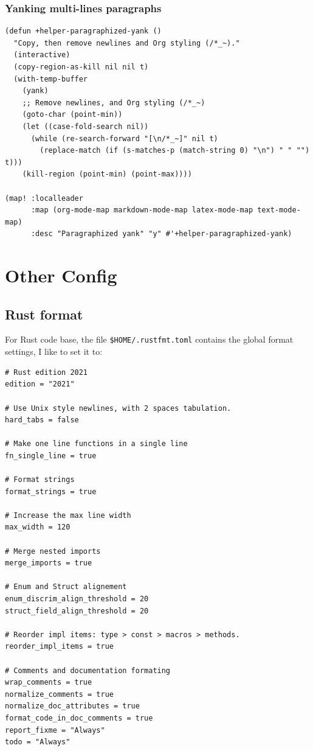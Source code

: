 \documentclass[11pt]{article}
\begin{document}
\subsubsection{Yanking multi-lines paragraphs}
\label{sec:org6ccbc8c}

\begin{verbatim}
(defun +helper-paragraphized-yank ()
  "Copy, then remove newlines and Org styling (/*_~)."
  (interactive)
  (copy-region-as-kill nil nil t)
  (with-temp-buffer
    (yank)
    ;; Remove newlines, and Org styling (/*_~)
    (goto-char (point-min))
    (let ((case-fold-search nil))
      (while (re-search-forward "[\n/*_~]" nil t)
        (replace-match (if (s-matches-p (match-string 0) "\n") " " "") t)))
    (kill-region (point-min) (point-max))))

(map! :localleader
      :map (org-mode-map markdown-mode-map latex-mode-map text-mode-map)
      :desc "Paragraphized yank" "y" #'+helper-paragraphized-yank)
\end{verbatim}

\section{Other Config}
\label{sec:org3658b12}
\subsection{Rust format}
\label{sec:org16bcf8d}
For Rust code base, the file \texttt{\$HOME/.rustfmt.toml} contains the global format
settings, I like to set it to:

\begin{verbatim}
# Rust edition 2021
edition = "2021"

# Use Unix style newlines, with 2 spaces tabulation.
hard_tabs = false

# Make one line functions in a single line
fn_single_line = true

# Format strings
format_strings = true

# Increase the max line width
max_width = 120

# Merge nested imports
merge_imports = true

# Enum and Struct alignement
enum_discrim_align_threshold = 20
struct_field_align_threshold = 20

# Reorder impl items: type > const > macros > methods.
reorder_impl_items = true

# Comments and documentation formating
wrap_comments = true
normalize_comments = true
normalize_doc_attributes = true
format_code_in_doc_comments = true
report_fixme = "Always"
todo = "Always"
\end{verbatim}
\end{document}
